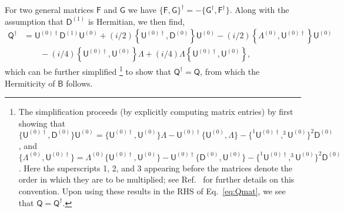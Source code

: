 For two general matrices $\mathsf{F}$ and $\mathsf{G}$ we have $\{\mathsf{F},\mathsf{G}\}^{\dagger} = -\{\mathsf{G}^{\dagger},\mathsf{F}^{\dagger}\}$.
Along with the assumption that $\mathsf{D}^{(1)}$ is Hermitian, we then find,
%
\begin{equation}
  \begin{aligned}
    \mathsf{Q}^{\dagger} &=  \mathsf{U}^{(0)\dagger}\mathsf{D}^{(1)}\mathsf{U}^{(0)} + (i/2)\left\{\mathsf{U}^{(0)\dagger},   \mathsf{D}^{(0)}\right\}\mathsf{U}^{(0)} - (i/2)\left\{\Lambda^{(0)}, \mathsf{U}^{(0)\dagger}\right\}\mathsf{U}^{(0)}\\
                         &\phantom{}\qquad - (i/4)\left\{\mathsf{U}^{(0)\dagger}, \mathsf{U}^{(0)}\right\}\Lambda
  + (i/4)\Lambda\left\{\mathsf{U}^{(0)\dagger}, \mathsf{U}^{(0)}\right\},
  \end{aligned}
  \label{eq:Qmat}
\end{equation}
%
which can be further simplified%
\footnote{The simplification proceeds (by explicitly computing matrix entries) by first showing that
  $\{\mathsf{U}^{(0)\dagger}, \mathsf{D}^{(0)}\}\mathsf{U}^{(0)} = \{\mathsf{U}^{(0)\dagger}, \mathsf{U}^{(0)}\}\Lambda - \mathsf{U}^{(0)\dagger}\{\mathsf{U}^{(0)}, \Lambda\} - \{ ^{1}\mathsf{U}^{(0)\dagger}, ^{3}\mathsf{U}^{(0)}\}^{2}\mathsf{D}^{(0)}$,
  and
  $\{\Lambda^{(0)}, \mathsf{U}^{(0)\dagger}\} = \Lambda^{(0)}\{\mathsf{U}^{(0)\dagger},\mathsf{U}^{(0)}\} - \mathsf{U}^{(0)\dagger}\{\mathsf{D}^{(0)},\mathsf{U}^{(0)}\} - \{^{1}\mathsf{U}^{(0)\dagger},^{3}\mathsf{U}^{(0)}\}^{2}\mathsf{D}^{(0)}$.
  Here the superscripts 1, 2, and 3 appearing before the matrices denote the order in which they are to be multiplied; see Ref.~\cite{littlejohn1991a} for further details on this convention.
  Upon using these results in the RHS of Eq.~\eqref{eq:Qmat}, we see that $\mathsf{Q}=\mathsf{Q}^{\dagger}$.
}
to show that $\mathsf{Q}^{\dagger} = \mathsf{Q}$, from which the Hermiticity of $\mathsf{B}$ follows.

